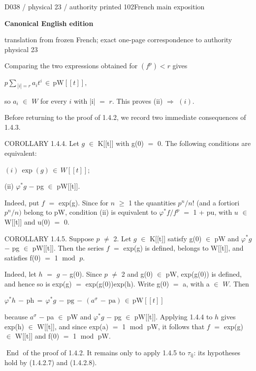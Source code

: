 \documentclass[9pt]{article}
\newcommand{\CanonText}[1]{\par{\fontsize{8.0}{9.35}\selectfont\RaggedRight #1\par}\vspace{2.2pt}}
\newcommand{\CanonDisplay}[1]{\par\vspace{1.2pt}\begin{center}{\fontsize{7.2}{8.4}\selectfont\(\displaystyle #1\)}\end{center}\vspace{1.2pt}}
\newcommand{\LayerTitle}{Canonical English edition}
\begin{document}
\noindent\begin{minipage}[t][\dimexpr\textheight-5pt\relax][t]{\textwidth}
{\sffamily\fontsize{7.3}{8.2}\selectfont\color{Quiet} D038 / physical 23 / authority printed 102\hfill French main exposition}
\par{}\vspace{4.5pt}
{\sffamily\fontsize{10.4}{11.6}\selectfont\bfseries\color{Accent} \LayerTitle}
\par{\sffamily\fontsize{6.7}{7.7}\selectfont\color{Quiet} translation from frozen French; exact one-page correspondence to authority physical 23}
\vspace{5pt}
\CanonText{Comparing the two expressions obtained for \((f^{p})<r\) gives}
\CanonDisplay{p\sum{}_{|i|=r}\,a_{i}t^{i}\,\in{}\,\text{pW}[[t]],}
\CanonText{so \(a_{i}\) \(\in{}\) \(W\) for every \(i\) with |i| \(=\) \(r\). This proves (ii) \(\Rightarrow{}\) \((i)\).}
\CanonText{Before returning to the proof of 1.4.2, we record two immediate consequences of 1.4.3.}
\CanonText{COROLLARY 1.4.4. Let \(g\) \(\in{}\) K[[t]] with g(0) \(=\) 0. The following conditions are equivalent:}
\CanonDisplay{(i)\,\operatorname{exp}(g)\,\in{}\,W[[t]];}
\CanonText{(ii) \(\varphi{}^{*}g\) \(-\) pg \(\in{}\) pW[[t]].}
\CanonText{Indeed, put \(f\) \(=\) exp(g). Since for \(n\) \(\geq{}\) 1 the quantities \(p^{n}/n\)! (and a fortiori \(p^{n}/n)\) belong to pW, condition (ii) is equivalent to \(\varphi{}^{*}f/f^{p}\) \(=\) 1 + pu, with \(u\) \(\in{}\) W[[t]] and u(0) \(=\) 0.}
\CanonText{COROLLARY 1.4.5. Suppose \(p\) \(\neq{}\) 2. Let \(g\) \(\in{}\) K[[t]] satisfy g(0) \(\in{}\) pW and \(\varphi{}^{*}g\) \(-\) pg \(\in{}\) pW[[t]]. Then the series \(f\) \(=\) exp(g) is defined, belongs to W[[t]], and satisfies f(0) \(=\) 1 \(\operatorname{mod}\) \(p\).}
\CanonText{Indeed, let \(h\) \(=\) \(g\) \(-\) g(0). Since \(p\) \(\neq{}\) 2 and g(0) \(\in{}\) pW, exp(g(0)) is defined, and hence so is exp(g) \(=\) exp(g(0))exp(h). Write g(0) \(=\) a, with a \(\in{}\) \(W\). Then}
\CanonDisplay{\varphi{}^{*}h\,-\,\text{ph}\,=\,\varphi{}^{*}g\,-\,\text{pg}\,-\,(a^\sigma{}\,-\,\text{pa})\,\in{}\,\text{pW}[[t]]}
\CanonText{because \(a^\sigma{}\) \(-\) pa \(\in{}\) pW and \(\varphi{}^{*}g\) \(-\) pg \(\in{}\) pW[[t]]. Applying 1.4.4 to \(h\) gives exp(h) \(\in{}\) W[[t]], and since exp(a) \(=\) 1 \(\operatorname{mod}\) pW, it follows that \(f\) \(=\) exp(g) \(\in{}\) W[[t]] and f(0) \(=\) 1 \(\operatorname{mod}\) pW.}
\CanonText{\(\operatorname{End}\) of the proof of 1.4.2. It remains only to apply 1.4.5 to \(\tau{}_{\mathrm{ij}}\): its hypotheses hold by (1.4.2.7) and (1.4.2.8).}

\end{minipage}
\end{document}
